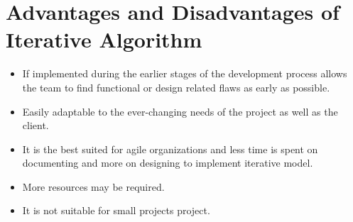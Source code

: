 \documentclass[11pt]{article}
\begin{document}
\section{Advantages and Disadvantages of Iterative Algorithm }
\begin{itemize}
\item If implemented during the earlier stages of the development process allows the team to find functional or design related flaws as early as possible.
\item Easily adaptable to the ever-changing needs of the project as well as the client.
\item It is the best suited for agile organizations and less time is spent on documenting and more on designing to implement iterative model.
\item More resources may be required.
\item It is not suitable for small projects project.
\end{itemize}   
\end{document}
